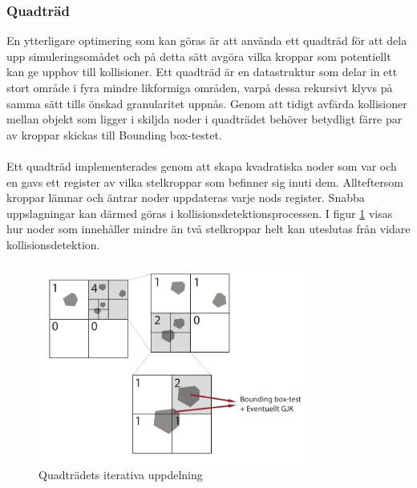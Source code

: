\documentclass[a4paper,12pt,twopage,swedish]{article}
\begin{document}
\subsubsection{Quadträd}

En ytterligare optimering som kan göras är att använda ett quadträd för att dela upp simuleringsomådet och på detta sätt avgöra vilka kroppar som potentiellt kan ge upphov till kollisioner. Ett quadträd är en datastruktur som delar in ett stort område i fyra mindre likformiga områden, varpå dessa rekursivt klyvs på samma sätt tills önskad granularitet uppnås. Genom att tidigt avfärda kollisioner mellan objekt som ligger i skiljda noder i quadträdet behöver betydligt färre  par av kroppar skickas till Bounding box-testet. 
\\
\\Ett quadträd implementerades genom att skapa kvadratiska noder som var och en gavs ett register av vilka stelkroppar som befinner sig inuti dem. Allteftersom kroppar lämnar och äntrar noder uppdateras varje nods register. Snabba uppslagningar kan därmed göras i kollisionsdetektionsprocessen. I figur  \ref{fig:quadtree} visas hur noder som innehåller mindre än två stelkroppar helt kan uteslutas från vidare kollisionsdetektion.

\begin{figure}[H]
\centering
\includegraphics[width=0.8\textwidth]{illustrations/quadtree.pdf}
\caption{Quadträdets iterativa uppdelning}
\label{fig:quadtree}
\end{figure}


\end{document}
